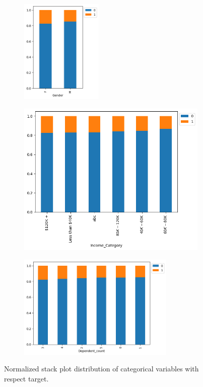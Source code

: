 \documentclass[10pt,a4paper]{style}
\begin{document}
\begin{figure}[h]
\begin{subfigure}[t]{0.32\textwidth}
			\centering
			\includegraphics[width=\textwidth,height=5cm]{Attrition_Flag vs Gender.png}
			\caption{}
			\label{fig:Attrition_Flag vs Gender}
		\end{subfigure}
		\hfill
		\begin{subfigure}[t]{0.32\textwidth}
			\centering
			\includegraphics[width=\textwidth]{Attrition_Flag vs Income_Category.png}
			\caption{}
			\label{fig:Attrition_Flag vs Income_Category}
		\end{subfigure}
		\hfill
		\begin{subfigure}[t]{0.33\textwidth}
			\centering
			\includegraphics[width=\textwidth,height=5cm]{Attrition_Flag vs Dependent_count.png}
			\caption{}
			\label{fig:Attrition_Flag vs Dependent_count}
		\end{subfigure}
		\caption{Normalized stack plot distribution of categorical variables with respect target.}
		\label{fig:stackplot_wrt_target}
	\end{figure}
\end{document}
